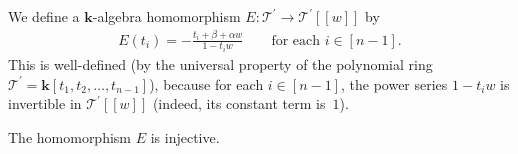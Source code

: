 \begin{Definition} We define a $\mathbf{k}$-algebra homomorphism $E\colon \mathcal{T}^{\prime}\rightarrow\mathcal{T}^{\prime}[[w]] $ by
\begin{gather*}
E(t_{i}) =-\frac{t_{i}+\beta+\alpha w}{1-t_{i}w} \qquad \text{for each }i\in[n-1] .
\end{gather*}
This is well-defined (by the universal property of the polynomial ring $\mathcal{T}^{\prime}=\mathbf{k}[ t_{1},t_{2},\ldots,t_{n-1}] $), because for each $i\in[n-1] $, the power series $1-t_{i}w$ is invertible in $\mathcal{T}^{\prime}[[w]] $ (indeed, its constant term is~$1$).
\end{Definition}

\begin{Proposition}\label{prop.E.inj}The homomorphism $E$ is injective.
\end{Proposition}

